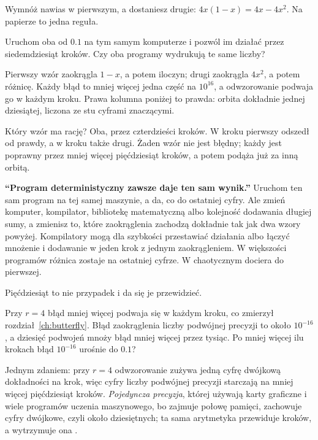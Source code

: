 \noindent
Wymnóż nawias w pierwszym, a dostaniesz drugie:
$4x(1 - x) = 4x - 4x^{2}$. Na papierze to jedna reguła.

\begin{think}
Uruchom oba od $\num{0.1}$ na tym samym komputerze i pozwól im działać przez
siedemdziesiąt kroków. Czy oba programy wydrukują te same liczby?
\end{think}
Pierwszy wzór zaokrągla $1 - x$, a potem iloczyn; drugi zaokrągla $4x^{2}$,
a potem różnicę. Każdy błąd to mniej więcej jedna część na $10^{16}$, a
odwzorowanie podwaja go w każdym kroku. Prawa kolumna poniżej to prawda:
orbita dokładnie jednej dziesiątej, liczona ze stu cyframi znaczącymi.


\noindent
Który wzór ma rację? Oba, przez czterdzieści kroków. W kroku
 pierwszy odszedł od prawdy, a w kroku 
także drugi. Żaden wzór nie jest błędny; każdy jest poprawny przez mniej
więcej pięćdziesiąt kroków, a potem podąża już za inną orbitą.

\begin{trapbox}
\textbf{\enquote{Program deterministyczny zawsze daje ten sam wynik.}}
Uruchom ten sam program na tej samej maszynie, a da, co do ostatniej cyfry.
Ale zmień komputer, kompilator, bibliotekę matematyczną albo kolejność
dodawania długiej sumy, a zmienisz to, które zaokrąglenia zachodzą \dash{}
dokładnie tak jak dwa wzory powyżej. Kompilatory mogą dla szybkości
przestawiać działania albo łączyć mnożenie i dodawanie w jeden krok z jednym
zaokrągleniem. W większości programów różnica zostaje na ostatniej cyfrze. W
chaotycznym dociera do pierwszej.
\end{trapbox}

\noindent
Pięćdziesiąt to nie przypadek i da się je przewidzieć.

\begin{think}
Przy $r = 4$ błąd mniej więcej podwaja się w każdym kroku, co zmierzył
rozdział~\ref{ch:butterfly}. Błąd zaokrąglenia liczby podwójnej precyzji to
około $10^{-16}$, a dziesięć podwojeń mnoży błąd mniej więcej przez tysiąc.
Po mniej więcej ilu krokach błąd $10^{-16}$ urośnie do $\num{0.1}$?
\end{think}
Jednym zdaniem: przy $r = 4$ odwzorowanie zużywa jedną cyfrę dwójkową
dokładności na krok, więc  cyfry liczby podwójnej
precyzji starczają na mniej więcej pięćdziesiąt kroków. \emph{Pojedyncza
precyzja}, której używają karty graficzne i wiele programów uczenia
maszynowego, bo zajmuje połowę pamięci, zachowuje  cyfry
dwójkowe, czyli około  dziesiętnych; ta sama arytmetyka przewiduje  kroków, a
wytrzymuje ona .

